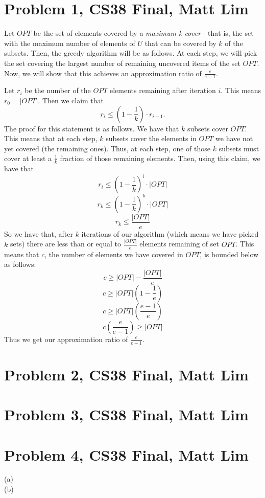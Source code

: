 \documentclass{article}
\begin{document}
\section*{Problem 1, CS38 Final, Matt Lim}
Let $OPT$ be the set of elements covered by a \textit{maximum k-cover} - that is, the set
with the maximum number of elements of $U$ that can be covered by $k$ of the
subsets. Then, the greedy algorithm will be as follows. At each step, we will pick the set
covering the largest number of remaining uncovered items of the set $OPT$. Now, we will show that
this achieves an approximation ratio of $\frac{e}{e-1}$.

Let $r_i$ be the number of the $OPT$ elements remaining after
iteration $i$. This means $r_0 = |OPT|$. Then we claim that
\[ r_i \leq (1 - \frac{1}{k}) \cdot r_{i-1}. \]
The proof for this statement is as follows. We have
that $k$ subsets cover $OPT$. This means that at each step, $k$ subsets
cover the elements in $OPT$ we have not yet covered (the remaining ones).
Thus, at each step, one of those $k$ subsets must cover at least a $\frac{1}{k}$
fraction of those remaining elements. Then, using this claim, we have that
\[ r_i \leq (1 - \frac{1}{k})^i \cdot |OPT| \]
\[ r_k \leq (1 - \frac{1}{k})^k \cdot |OPT| \]
\[ r_k \leq \frac{|OPT|}{e} \]
So we have that, after $k$ iterations of our algorithm (which means we have
picked $k$ sets) there are less than or equal to $\frac{|OPT|}{e}$ elements
remaining of set $OPT$. This means that $c$, the number of elements we have
covered in $OPT$, is bounded below as follows:
\[ c \geq |OPT| - \frac{|OPT|}{e} \]
\[ c \geq |OPT|(1 - \frac{1}{e}) \]
\[ c \geq |OPT|(\frac{e-1}{e}) \]
\[ c(\frac{e}{e-1}) \geq |OPT| \]
Thus we get our approximation ratio of $\frac{e}{e-1}$.
\newpage

\section*{Problem 2, CS38 Final, Matt Lim}
\newpage

\section*{Problem 3, CS38 Final, Matt Lim}
\newpage

\section*{Problem 4, CS38 Final, Matt Lim}
\begin{description}
    \item[(a)]
    \item[(b)]
\end{description}
\newpage

\end{document}
